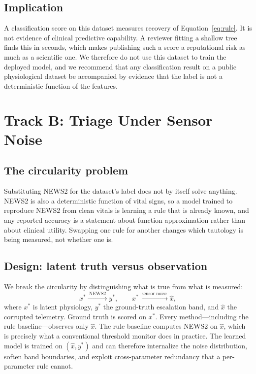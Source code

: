 \documentclass[lettersize,journal]{IEEEtran}
\begin{document}
\subsection{Implication}

A classification score on this dataset measures recovery of
Equation~\ref{eq:rule}. It is not evidence of clinical predictive capability. A
reviewer fitting a shallow tree finds this in seconds, which makes publishing
such a score a reputational risk as much as a scientific one. We therefore do
not use this dataset to train the deployed model, and we recommend that any
classification result on a public physiological dataset be accompanied by
evidence that the label is not a deterministic function of the features.

\section{Track B: Triage Under Sensor Noise}
\label{sec:trackb}

\subsection{The circularity problem}

Substituting NEWS2 for the dataset's label does not by itself solve anything.
NEWS2 is also a deterministic function of vital signs, so a model trained to
reproduce NEWS2 from clean vitals is learning a rule that is already known, and
any reported accuracy is a statement about function approximation rather than
about clinical utility. Swapping one rule for another changes which tautology is
being measured, not whether one is.

\subsection{Design: latent truth versus observation}

We break the circularity by distinguishing what is true from what is measured:
\[
x^{*} \xrightarrow{\ \mathrm{NEWS2}\ } y^{*}, \qquad
x^{*} \xrightarrow{\ \text{sensor noise}\ } \hat{x},
\]
where $x^{*}$ is latent physiology, $y^{*}$ the ground-truth escalation band,
and $\hat{x}$ the corrupted telemetry. Ground truth is scored on $x^{*}$. Every
method---including the rule baseline---observes only $\hat{x}$. The rule
baseline computes NEWS2 on $\hat{x}$, which is precisely what a conventional
threshold monitor does in practice. The learned model is trained on
$(\hat{x}, y^{*})$ and can therefore internalize the noise distribution, soften
band boundaries, and exploit cross-parameter redundancy that a per-parameter
rule cannot.
\end{document}
